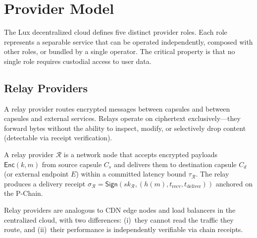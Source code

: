 

\section{Provider Model}
\label{sec:model}

The Lux decentralized cloud defines five distinct provider roles. Each role
represents a separable service that can be operated independently, composed
with other roles, or bundled by a single operator. The critical property is
that no single role requires custodial access to user data.

\subsection{Relay Providers}

A relay provider routes encrypted messages between capsules and between capsules
and external services. Relays operate on ciphertext exclusively---they forward
bytes without the ability to inspect, modify, or selectively drop content
(detectable via receipt verification).

\begin{definition}
A relay provider $\mathcal{R}$ is a network node that accepts encrypted payloads
$\mathsf{Enc}(k, m)$ from source capsule $C_s$ and delivers them to destination
capsule $C_d$ (or external endpoint $E$) within a committed latency bound
$\tau_{\mathcal{R}}$. The relay produces a delivery receipt
$\sigma_{\mathcal{R}} = \mathsf{Sign}(sk_{\mathcal{R}}, (h(m), t_{\text{recv}}, t_{\text{deliver}}))$
anchored on the P-Chain.
\end{definition}

Relay providers are analogous to CDN edge nodes and load balancers in the
centralized cloud, with two differences: (i)~they cannot read the traffic
they route, and (ii)~their performance is independently verifiable via
chain receipts.

